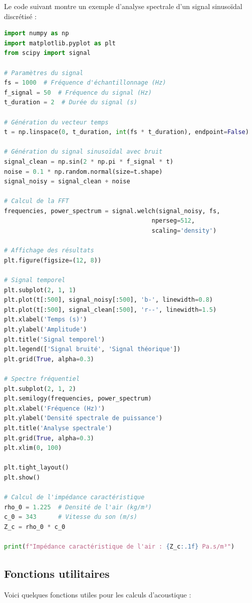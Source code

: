 Le code suivant montre un exemple d'analyse spectrale d'un signal sinusoïdal discrétisé :

\begin{lstlisting}[language=Python, caption=Analyse spectrale d'un signal sinusoïdal]
import numpy as np
import matplotlib.pyplot as plt
from scipy import signal

# Paramètres du signal
fs = 1000  # Fréquence d'échantillonnage (Hz)
f_signal = 50  # Fréquence du signal (Hz)
t_duration = 2  # Durée du signal (s)

# Génération du vecteur temps
t = np.linspace(0, t_duration, int(fs * t_duration), endpoint=False)

# Génération du signal sinusoïdal avec bruit
signal_clean = np.sin(2 * np.pi * f_signal * t)
noise = 0.1 * np.random.normal(size=t.shape)
signal_noisy = signal_clean + noise

# Calcul de la FFT
frequencies, power_spectrum = signal.welch(signal_noisy, fs, 
                                         nperseg=512, 
                                         scaling='density')

# Affichage des résultats
plt.figure(figsize=(12, 8))

# Signal temporel
plt.subplot(2, 1, 1)
plt.plot(t[:500], signal_noisy[:500], 'b-', linewidth=0.8)
plt.plot(t[:500], signal_clean[:500], 'r--', linewidth=1.5)
plt.xlabel('Temps (s)')
plt.ylabel('Amplitude')
plt.title('Signal temporel')
plt.legend(['Signal bruité', 'Signal théorique'])
plt.grid(True, alpha=0.3)

# Spectre fréquentiel
plt.subplot(2, 1, 2)
plt.semilogy(frequencies, power_spectrum)
plt.xlabel('Fréquence (Hz)')
plt.ylabel('Densité spectrale de puissance')
plt.title('Analyse spectrale')
plt.grid(True, alpha=0.3)
plt.xlim(0, 100)

plt.tight_layout()
plt.show()

# Calcul de l'impédance caractéristique
rho_0 = 1.225  # Densité de l'air (kg/m³)
c_0 = 343      # Vitesse du son (m/s)
Z_c = rho_0 * c_0

print(f"Impédance caractéristique de l'air : {Z_c:.1f} Pa.s/m³")
\end{lstlisting}

\subsection{Fonctions utilitaires}

Voici quelques fonctions utiles pour les calculs d'acoustique :

